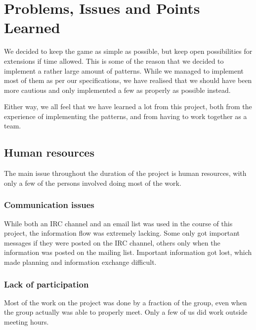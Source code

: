 \chapter{Problems, Issues and Points Learned}
\label{cha:problems_issues_and_points_learned}



We decided to keep the game as simple as possible, but keep open possibilities for extensions if time allowed. This is some of the reason that we decided to implement a rather large amount of patterns. While we managed to implement most of them as per our specifications, we have realised that we should have been more cautious and only implemented a few as properly as possible instead.

Either way, we all feel that we have learned a lot from this project, both from the experience of implementing the patterns, and from having to work together as a team.


\section{Human resources}
The main issue throughout the duration of the project is human resources, with only a few of the persons involved doing most of the work. 


\subsection{Communication issues}
While both an IRC channel and an email list was used in the course of this project, the information flow was extremely lacking. Some only got important messages if they were posted on the IRC channel, others only when the information was posted on the mailing list. Important information got lost, which made planning and information exchange difficult.


\subsection{Lack of participation}
Most of the work on the project was done by a fraction of the group, even when the group actually was able to properly meet. Only a few of us did work outside meeting hours.


